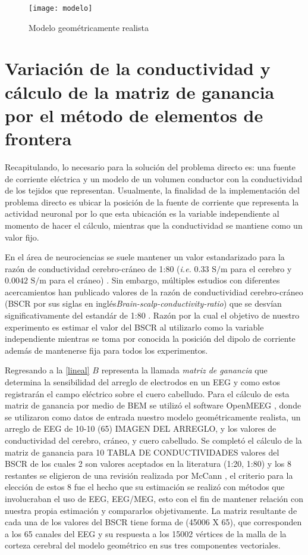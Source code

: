 \begin{figure}[htb]
	\texttt{[image: modelo]}
	\caption{Modelo geométricamente realista}
	\label{fig:methodology:model}
\end{figure}


\section{Variación de la conductividad y cálculo de la matriz de ganancia por el método de elementos de frontera}
\label{sec:methodology:openmeeg}

Recapitulando, lo necesario para la solución del problema directo es: una fuente de corriente eléctrica y un modelo de un volumen conductor con la conductividad de los tejidos que representan. Usualmente, la finalidad de la implementación del problema directo es ubicar la posición de la fuente de corriente que representa la actividad neuronal por lo que esta ubicación es la variable independiente al momento de hacer el cálculo, mientras que la conductividad se mantiene como un valor fijo. 

En el área de neurociencias se suele mantener un valor estandarizado para la razón de conductividad cerebro-cráneo de 1:80 (\emph{i.e.} $0.33\text{ S/m}$ para el cerebro y $0.0042 \text{ S/m}$ para el cráneo) \cite{Rush1968,Rush1969,Cohen1983}. Sin embargo, múltiples estudios con diferentes acercamientos han publicado valores de la razón de conductividiad cerebro-cráneo (BSCR por sus siglas en inglés\emph{Brain-scalp-conductivity-ratio}) que se desvían significativamente del estandár de 1:80 \cite{McCann2019}. Razón por la cual el objetivo de nuestro experimento es estimar el valor del BSCR al utilizarlo como la variable independiente mientras se toma por conocida la posición del dipolo de corriente además de mantenerse fija para todos los experimentos.

Regresando a la \cref{lineal} $B$ representa la llamada \emph{matriz de ganancia} que determina la sensibilidad del arreglo de electrodos en un EEG y como estos registrarán el campo eléctrico sobre el cuero cabelludo. Para el cálculo de esta matriz de ganancia por medio de BEM se utilizó el software OpenMEEG \cite{open,open2}, donde se utilizaron como datos de entrada nuestro modelo geométricamente realista, un arreglo de EEG de 10-10 (65) IMAGEN DEL ARREGLO, y los valores de conductividad del cerebro, cráneo, y cuero cabelludo. Se completó el cálculo de la matriz de ganancia para 10 TABLA DE CONDUCTIVIDADES valores del BSCR de los cuales 2 son valores aceptados en la literatura (1:20, 1:80) y los 8 restantes se eligieron de una revisión realizada por McCann \cite{McCann2019}, el criterio para la elección de estos 8 fue el hecho que su estimación se realizó con métodos que involucraban el uso de EEG, EEG/MEG, esto con el fin de mantener relación con nuestra propia estimación y compararlos objetivamente. La matriz resultante de cada una de los valores del BSCR tiene forma de (45006 X 65), que corresponden a los 65 canales del EEG y su respuesta a los 15002 vértices de la malla de la corteza cerebral del modelo geométrico en sus tres componentes vectoriales.

